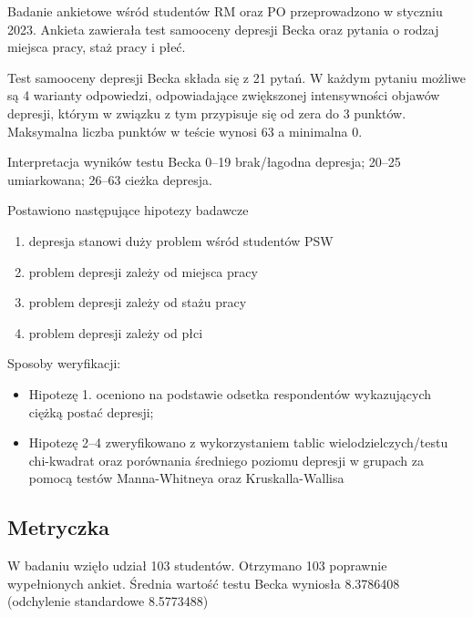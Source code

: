 \documentclass[
  openany]{book}
\begin{document}
Badanie ankietowe wśród studentów RM oraz PO przeprowadzono w styczniu 2023.
Ankieta zawierała test samooceny depresji Becka oraz pytania
o rodzaj miejsca pracy, staż pracy i płeć.

Test samooceny depresji Becka składa się z 21 pytań. W każdym pytaniu
możliwe są 4 warianty odpowiedzi, odpowiadające zwiększonej intensywności objawów depresji,
którym w związku z tym przypisuje się od zera do 3 punktów. Maksymalna liczba punktów
w teście wynosi 63 a minimalna 0.

Interpretacja wyników testu Becka 0--19 brak/łagodna depresja;
20--25 umiarkowana; 26--63 cieżka depresja.

Postawiono następujące hipotezy badawcze

\begin{enumerate}
\def\labelenumi{\arabic{enumi}.}
\item
  depresja stanowi duży problem wśród studentów PSW
\item
  problem depresji zależy od miejsca pracy
\item
  problem depresji zależy od stażu pracy
\item
  problem depresji zależy od płci
\end{enumerate}

Sposoby weryfikacji:

\begin{itemize}
\item
  Hipotezę 1. oceniono na podstawie odsetka respondentów wykazujących ciężką postać depresji;
\item
  Hipotezę 2--4 zweryfikowano z wykorzystaniem tablic wielodzielczych/testu chi-kwadrat
  oraz porównania średniego poziomu depresji w grupach za pomocą testów Manna-Whitneya oraz
  Kruskalla-Wallisa
\end{itemize}

\hypertarget{metryczka}{%
\subsection{Metryczka}\label{metryczka}}

W badaniu wzięło udział 103 studentów. Otrzymano 103 poprawnie
wypełnionych ankiet. Średnia wartość testu Becka wyniosła 8.3786408 (odchylenie
standardowe 8.5773488)
\end{document}
